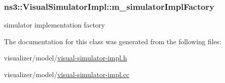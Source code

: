 \subsubsection[{\texorpdfstring{m\+\_\+simulator\+Impl\+Factory}{m_simulatorImplFactory}}]{ ns3\+::\+Visual\+Simulator\+Impl\+::m\+\_\+simulator\+Impl\+Factory\hspace{0.3cm}{\ttfamily [private]}}\hypertarget{classns3_1_1VisualSimulatorImpl_a70ced83e592d6aac7ff41638d0d7b3e3}{}\label{classns3_1_1VisualSimulatorImpl_a70ced83e592d6aac7ff41638d0d7b3e3}


simulator implementation factory 



The documentation for this class was generated from the following files\+:\begin{DoxyCompactItemize}
\item 
visualizer/model/\hyperlink{visual-simulator-impl_8h}{visual-\/simulator-\/impl.\+h}\item 
visualizer/model/\hyperlink{visual-simulator-impl_8cc}{visual-\/simulator-\/impl.\+cc}\end{DoxyCompactItemize}
